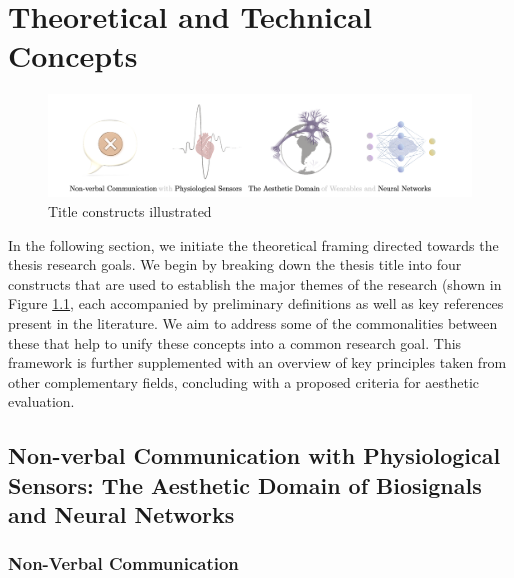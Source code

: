 

\chapter{Theoretical and Technical Concepts}
\label{cha:technical_concepts}

\begin{figure}[htbp]
	\centering
	\includegraphics[width=\textwidth]{Chapters/Figures/background/sec2_title_constructs_alpha_2.png}
	\caption{Title constructs illustrated}
	\label{fig:title_constructs}
\end{figure}

In the following section, we initiate the theoretical framing directed towards the thesis research goals. We begin by breaking down the thesis title into four constructs that are used to establish the major themes of the research (shown in Figure \ref{fig:title_constructs}, each accompanied by preliminary definitions as well as key references present in the literature. We aim to address some of the commonalities between these that help to unify these concepts into a common research goal. This framework is further supplemented with an overview of key principles taken from other complementary fields, concluding with a proposed criteria for aesthetic evaluation.

\section{Non-verbal Communication with Physiological Sensors: The Aesthetic Domain of Biosignals and Neural Networks}
\label{sec:title_constructs}


\subsection{Non-Verbal Communication}

